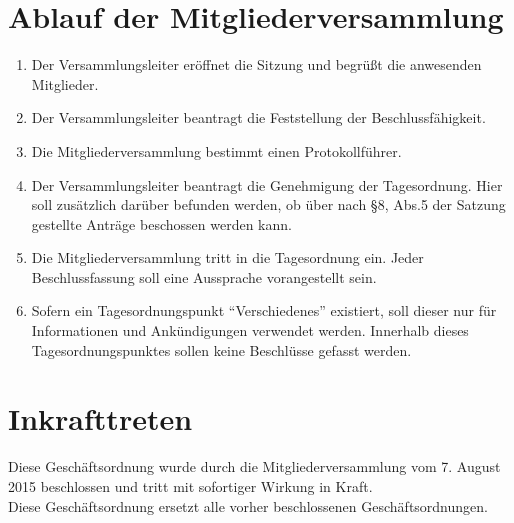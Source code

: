 \documentclass[a4paper, 12pt]{scrartcl}
\begin{document}
\section{Ablauf der Mitgliederversammlung}
\begin{enumerate} 
	\item Der Versammlungsleiter eröffnet die Sitzung und begrüßt die anwesenden Mitglieder.
	\item Der Versammlungsleiter beantragt die Feststellung der Beschlussfähigkeit.
	\item Die Mitgliederversammlung bestimmt einen Protokollführer.
	\item Der Versammlungsleiter beantragt die Genehmigung der Tagesordnung. Hier soll zusätzlich darüber befunden werden, ob über nach §8, Abs.5 der Satzung gestellte Anträge beschossen werden kann.
	\item Die Mitgliederversammlung tritt in die Tagesordnung ein. Jeder Beschlussfassung soll eine Aussprache vorangestellt sein.
	\item Sofern ein Tagesordnungspunkt "`Verschiedenes"' existiert, soll dieser nur für Informationen und Ankündigungen verwendet werden. Innerhalb dieses Tagesordnungspunktes sollen keine Beschlüsse gefasst werden.
\end{enumerate}

\section{Inkrafttreten}
Diese Geschäftsordnung wurde durch die Mitgliederversammlung vom 7. August 2015 beschlossen und tritt mit sofortiger Wirkung in Kraft.\\
Diese Geschäftsordnung ersetzt alle vorher beschlossenen Geschäftsordnungen.
\end{document}
